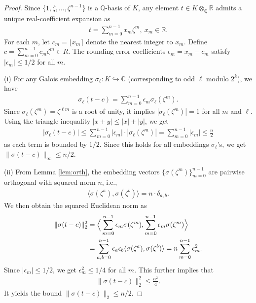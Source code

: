 \documentclass[10pt,a4paper]{amsart}
\newcommand{\C}{\mathbb{C}}
\newcommand{\Q}{\mathbb{Q}}
\newcommand{\R}{\mathbb{R}}
\begin{document}
\begin{proof}
Since $\{1, \zeta, \dots, \zeta^{n-1}\}$ is a $\Q$-basis of $K$, any element $t \in K\otimes_\Q\R$ admits a unique real-coefficient expansion as
\begin{align}
t=\sum_{m=0}^{n-1} x_m \zeta^m, \ x_m \in \R.
\label{E:exp}
\end{align}
For each $m$, let $c_m=\lfloor x_m \rceil$ denote the nearest integer to $x_m$. Define $c=\sum_{m=0}^{n-1} c_m \zeta^m \in R$. The rounding error coefficients $\epsilon_m=x_m-c_m$ satisfy $|\epsilon_m| \le 1/2$ for all $m$.

(i) For any Galois embedding $\sigma_\ell: K \hookrightarrow \C$ (corresponding to odd $\ell$ modulo $2^k$), we have
\begin{align}
\sigma_\ell(t-c)=\sum_{m=0}^{n-1} \epsilon_m \sigma_\ell(\zeta^m).
\label{E:emb}
\end{align}
Since $\sigma_\ell(\zeta^m)=\zeta^{\ell m}$ is a root of unity, it implies $|\sigma_\ell(\zeta^m)|=1$ for all $m$ and $\ell$. Using the triangle inequality $|x+y|\leq |x|+|y|$, we get 
\begin{align}
|\sigma_\ell(t-c)| \le \sum_{m=0}^{n-1} |\epsilon_m| \cdot |\sigma_\ell(\zeta^m)|=\sum_{m=0}^{n-1} |\epsilon_m|\le \frac{n}{2}
\label{E:sigtri}
\end{align}
as each term is bounded by $1/2$. Since this holds for all embeddings $\sigma_\ell$'s, we get $\|\sigma(t-c)\|_\infty \le n/2$.

(ii) From Lemma \ref{lem:orth}, the embedding vectors $\{\sigma(\zeta^m)\}_{m=0}^{n-1}$ are pairwise orthogonal with squared norm $n$, i.e., 
\begin{align}
\langle \sigma(\zeta^a), \sigma(\zeta^b) \rangle=n\cdot \delta_{a,b}.
\label{E:typair}
\end{align}
We then obtain the squared Euclidean norm as
\begin{align}
\|\sigma(t-c)\|_2^2&=\Big\langle \sum_{m=0}^{n-1} \epsilon_m \sigma(\zeta^m), \sum_{m=0}^{n-1} \epsilon_m \sigma(\zeta^m) \Big\rangle
\notag
  \\
&=\sum_{a,b=0}^{n-1} \epsilon_a \epsilon_b \langle \sigma(\zeta^a), \sigma(\zeta^b) \rangle=n \sum_{m=0}^{n-1} \epsilon_m^2.
\end{align}
Since $|\epsilon_m| \le 1/2$, we get $\epsilon_m^2 \le 1/4$ for all $m$. This further implies that
\begin{align}
\|\sigma(t-c)\|_2^2 \le \frac{n^2}{4}.
\label{E:signorm2}
\end{align}
It yields the bound $\|\sigma(t-c)\|_2 \le n/2$.
\end{proof}
\end{document}
